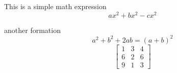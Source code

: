 \documentclass{article}
\begin{document}
	This is a simple math expression
	\[ax^2+bx^2-cx^2\]
	
	another formation
	\begin{equation}
		a^2+b^2+2ab = (a+b)^2
	\end{equation}
	\[
	\begin{bmatrix}
		1 & 3 & 4\\
		6 & 2 & 6\\
		9 & 1 & 3
	\end{bmatrix}
	\]
\end{document}
